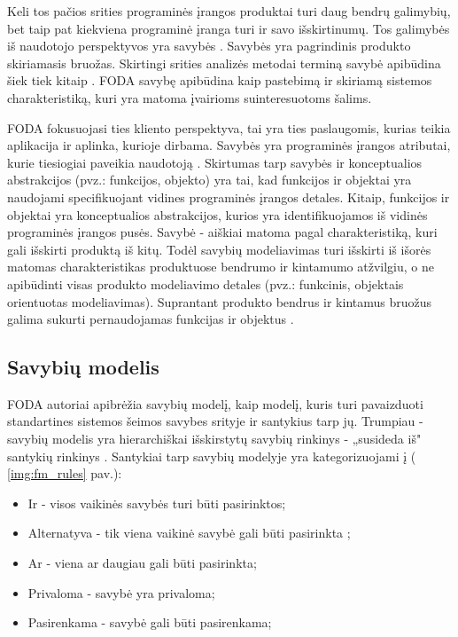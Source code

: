 \documentclass{VUMIFPSkursinis}
\begin{document}
Keli tos pačios srities programinės įrangos produktai turi daug bendrų galimybių, bet taip pat kiekviena programinė įranga turi ir savo išskirtinumų. Tos galimybės iš naudotojo perspektyvos yra savybės \cite{Kang1990}. Savybės yra pagrindinis produkto skiriamasis bruožas. Skirtingi srities analizės metodai terminą savybė apibūdina šiek tiek kitaip \cite{Lee2015}. FODA \cite{Kang1990} savybę apibūdina kaip pastebimą ir skiriamą sistemos charakteristiką, kuri yra matoma įvairioms suinteresuotoms šalims.

FODA fokusuojasi ties kliento perspektyva, tai yra ties paslaugomis, kurias teikia aplikacija ir aplinka, kurioje dirbama. Savybės yra programinės įrangos atributai, kurie tiesiogiai paveikia naudotoją \cite{Kang1990}. Skirtumas tarp savybės ir konceptualios abstrakcijos (pvz.: funkcijos, objekto) yra tai, kad funkcijos ir objektai yra naudojami specifikuojant vidines programinės įrangos detales. Kitaip, funkcijos ir objektai yra konceptualios abstrakcijos, kurios yra identifikuojamos iš vidinės programinės įrangos pusės. Savybė - aiškiai matoma  pagal charakteristiką, kuri gali išskirti produktą iš kitų. Todėl savybių modeliavimas turi išskirti iš išorės matomas charakteristikas produktuose bendrumo ir kintamumo atžvilgiu, o ne apibūdinti visas produkto modeliavimo detales (pvz.: funkcinis, objektais orientuotas modeliavimas). Suprantant produkto bendrus ir kintamus bruožus galima sukurti pernaudojamas funkcijas ir objektus \cite{Lee2015}.

\subsection{Savybių modelis}

FODA \cite{Kang1990} autoriai apibrėžia savybių modelį, kaip modelį, kuris turi pavaizduoti standartines sistemos šeimos savybes srityje ir santykius tarp jų. Trumpiau - savybių modelis yra hierarchiškai išskirstytų savybių rinkinys - „susideda iš" santykių rinkinys \cite{Kang1990, Batory2005}. Santykiai tarp savybių  modelyje yra kategorizuojami į ( \ref{img:fm_rules} pav.):
\begin{itemize}
\item Ir - visos vaikinės savybės turi būti pasirinktos;
\item Alternatyva - tik viena vaikinė savybė gali būti pasirinkta ;
\item Ar - viena ar daugiau gali būti pasirinkta;
\item Privaloma - savybė yra privaloma;
\item Pasirenkama - savybė gali būti pasirenkama;
\end{itemize}
\end{document}

